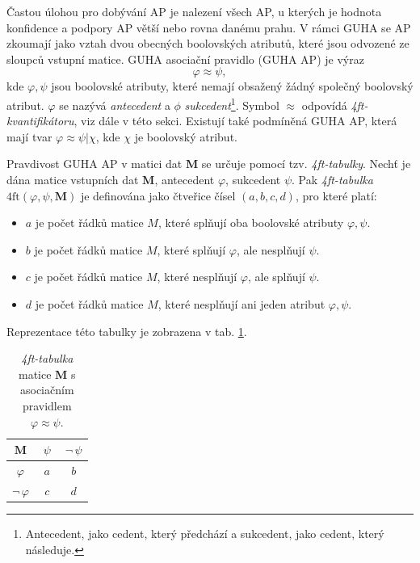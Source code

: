 Častou úlohou pro dobývání AP je nalezení všech AP, u kterých je hodnota konfidence a podpory AP větší nebo rovna danému prahu. V rámci GUHA se AP zkoumají jako vztah dvou obecných boolovských atributů, které jsou odvozené ze sloupců vstupní matice. GUHA asociační pravidlo (GUHA AP) je 
výraz 
\begin{equation}
    \varphi \approx \psi, 
\end{equation}
kde $\varphi, \psi$ jsou boolovské atributy, které nemají obsažený žádný společný boolovský atribut. $\varphi$ se nazývá \emph{antecedent} a $\phi$ \emph{sukcedent}\footnote{Antecedent, jako cedent, který předchází a sukcedent, jako cedent, který následuje.}. Symbol $\approx$ odpovídá \emph{4ft-kvantifikátoru}, viz dále v této sekci. Existují také podmíněná GUHA AP, která mají tvar  $\varphi \approx \psi | \chi$, kde $\chi$ je boolovský atribut.\cite{bib:GUHA}

Pravdivost GUHA AP v matici dat $\mathbf{M}$ se určuje pomocí tzv. \emph{4ft-tabulky}. Nechť je dána matice vstupních dat $\mathbf{M}$, antecedent $\varphi$, sukcedent $\psi$. Pak \emph{4ft-tabulka} $\mathrm{4ft}(\varphi,\psi,\mathbf{M})$ je definována jako čtveřice čísel $(a,b,c,d)$, pro které platí:
\begin{itemize}
    \itemsep0em
    \item $a$ je počet řádků matice $M$, které splňují oba boolovské atributy $\varphi, \psi$.
    \item $b$ je počet řádků matice $M$, které splňují $\varphi$, ale nesplňují $\psi$.
    \item $c$ je počet řádků matice $M$, které nesplňují $\varphi$, ale splňují $\psi$.
    \item $d$ je počet řádků matice $M$, které nesplňují ani jeden atribut $\varphi, \psi$.\cite{bib:GUHA}
\end{itemize}
Reprezentace této tabulky je zobrazena v tab. \ref*{tab:GUHA:tabulka}.

\begin{table}[hbtp!]
    \begin{center}
            \captionsetup{justification=centering}
    \caption{\emph{4ft-tabulka} matice $\mathbf{M}$ s asociačním pravidlem $\varphi \approx \psi$.}
    \begin{tabular}{c|c|c}
        $\mathbf{M}$ & $ \;\psi \;$& $\neg\,\psi$ \\
        \hline
        $\varphi$ & $a$& $b$ \\
        \hline
        $\neg\,\varphi$ & $c$& $d$ \\
        \end{tabular}
    \label{tab:GUHA:tabulka}
\end{center}
\end{table}

